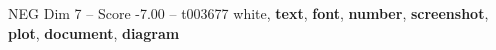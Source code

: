 \begin{textsample}{NEG Dim 7 – Score -7.00 – t003677}  \label{ex:f7_neg_037}
white, \textbf{text}, \textbf{font}, \textbf{number}, \textbf{screenshot}, \textbf{plot}, \textbf{document}, \textbf{diagram}

\end{textsample}
